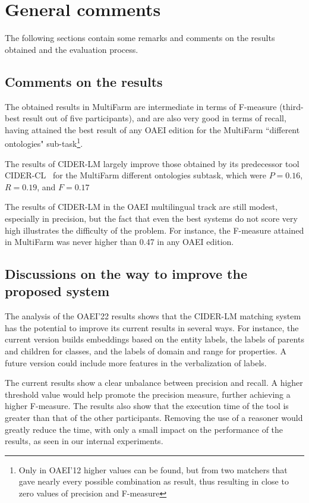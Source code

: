 \documentclass[
]{ceurart}
\begin{document}

\section{General comments}

The following sections contain some remarks and comments on the results obtained and the evaluation process.

\subsection{Comments on the results}

The obtained results in MultiFarm are intermediate in terms of F-measure (third-best result out of five participants), and are also very good in terms of recall, having attained the best result of any OAEI edition for the MultiFarm ``different ontologies" sub-task\footnote{Only in OAEI'12 higher values can be found, but from two matchers that gave nearly every possible combination as result, thus resulting in close to zero values of precision and F-measure}.

The results of CIDER-LM largely improve those obtained by its predecessor tool CIDER-CL~\cite{Gracia2013cidercl} for the MultiFarm different ontologies subtask, which were $P = 0.16$, $R = 0.19$, and $F = 0.17$

The results of CIDER-LM in the OAEI multilingual track are still modest, especially in precision, but the fact that even the best systems do not score very high illustrates the difficulty of the problem. For instance, the F-measure attained in MultiFarm was never higher than 0.47 in any OAEI edition.  

\subsection{Discussions on the way to improve the proposed system}

The analysis of the OAEI'22 results shows that the CIDER-LM matching system has the potential to improve its current results in several ways. For instance, the current version builds embeddings based on the entity labels, the labels of parents and children for classes, and the labels of domain and range for properties. A future version could include more features in the verbalization of labels. 

The current results show a clear unbalance between precision and recall. A higher threshold value would help promote the precision measure, further achieving a higher F-measure. The results also show that the execution time of the tool is greater than that of the other participants. Removing the use of a reasoner would greatly reduce the time, with only a small impact on the performance of the results, as seen in our internal experiments.
\end{document}
